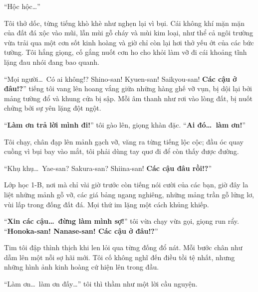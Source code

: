 \documentclass[../main.tex]{subfiles}
\begin{document}


``Hộc hộc\dots''

Tôi thở dốc, từng tiếng khò khè như nghẹn lại vì bụi. Cái không khí mặn mặn của đất đá xộc vào mũi, lẫn mùi gỗ cháy và mùi kim loại, như thể cả ngôi trường vừa trải qua một cơn sốt kinh hoàng và giờ chỉ còn lại hơi thở yếu ớt của các bức tường. Tôi hắng giọng, cố gắng nuốt cơn ho cho khỏi làm vỡ đi cái khoảng tĩnh lặng đau nhói đang bao quanh.

``Mọi người\dots\ Có ai không!? Shino-san! Kyuen-san! Saikyou-san! \textbf{Các cậu ở đâu!?}'' tiếng tôi vang lên hoang vắng giữa những hàng ghế vỡ vụn, bị dội lại bởi mảng tường đổ và khung cửa bị sập. Mỗi âm thanh như rơi vào lòng đất, bị nuốt chửng bởi sự yên lặng đột ngột.

``\textbf{Làm ơn trả lời mình đi!}'' tôi gào lên, giọng khàn đặc. ``\textbf{Ai đó\dots\ làm ơn!}''

Tôi chạy, chân đạp lên mảnh gạch vỡ, văng ra từng tiếng lộc cộc; đầu óc quay cuồng vì bụi bay vào mắt, tôi phải dùng tay quơ đi để còn thấy được đường.

``Khụ khụ\dots\ Yae-san? Sakura-san? Shiina-san! \textbf{Các cậu đâu rồi!?}''

Lớp học 1-B, nơi mà chỉ vài giờ trước còn tiếng nói cười của các bạn, giờ đây la liệt những mảnh gỗ vỡ, các giá bảng ngang nghiêng, những mảng trần gỗ lửng lơ, vùi lấp trong đống đất đá. Mọi thứ im lặng một cách khủng khiếp.

``\textbf{Xin các cậu\dots\ đừng làm mình sợ!}'' tôi vừa chạy vừa gọi, giọng run rẩy. ``\textbf{Honoka-san! Nanase-san! Các cậu ở đâu!?}''

Tim tôi đập thình thịch khi len lỏi qua từng đống đổ nát. Mỗi bước chân như dẫm lên một nỗi sợ hãi mới. Tôi cố không nghĩ đến điều tồi tệ nhất, nhưng những hình ảnh kinh hoàng cứ hiện lên trong đầu.

``Làm ơn\dots\ làm ơn đấy\dots'' tôi thì thầm như một lời cầu nguyện.
\end{document}
